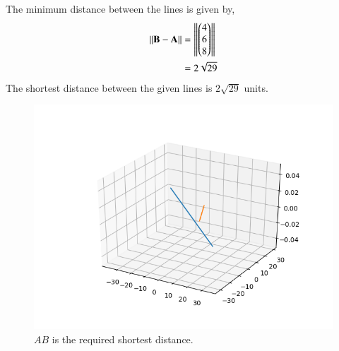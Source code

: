 \documentclass[journal,12pt,twocolumn]{IEEEtran}
\begin{document}
The minimum distance between the lines is given by,
\begin{align}
\left\lVert\mathbf{B}-\mathbf{A}\right\rVert &= \left\lVert\begin{pmatrix}4\\6\\8\end{pmatrix}\right\rVert\\
&= 2\sqrt{29}
\end{align}
The shortest distance between the given lines is $2\sqrt{29}$ units.

\begin{figure}[!ht]
\centering
\includegraphics[width=\columnwidth]{./figs/Figure_1.png}
\caption{$AB$ is the required shortest distance.}
\label{fig:}
\end{figure}
\end{document}
